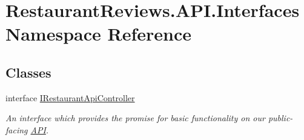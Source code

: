\hypertarget{namespace_restaurant_reviews_1_1_a_p_i_1_1_interfaces}{}\section{Restaurant\+Reviews.\+A\+P\+I.\+Interfaces Namespace Reference}
\label{namespace_restaurant_reviews_1_1_a_p_i_1_1_interfaces}
\subsection*{Classes}
\begin{DoxyCompactItemize}
\item 
interface \hyperlink{interface_restaurant_reviews_1_1_a_p_i_1_1_interfaces_1_1_i_restaurant_api_controller}{I\+Restaurant\+Api\+Controller}
\begin{DoxyCompactList}\small\item\em An interface which provides the promise for basic functionality on our public-\/facing \hyperlink{namespace_restaurant_reviews_1_1_a_p_i}{A\+PI}. \end{DoxyCompactList}\end{DoxyCompactItemize}
